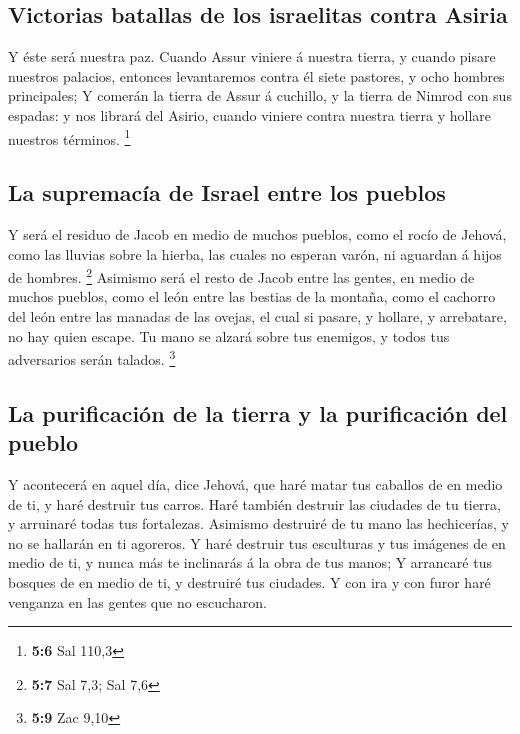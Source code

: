 \hypertarget{victorias-batallas-de-los-israelitas-contra-asiria}{%
\subsection{Victorias batallas de los israelitas contra
Asiria}\label{victorias-batallas-de-los-israelitas-contra-asiria}}

 Y éste será nuestra paz. Cuando Assur viniere á nuestra
tierra, y cuando pisare nuestros palacios, entonces levantaremos contra
él siete pastores, y ocho hombres principales;  Y comerán la
tierra de Assur á cuchillo, y la tierra de Nimrod con sus espadas: y nos
librará del Asirio, cuando viniere contra nuestra tierra y hollare
nuestros términos. \footnote{\textbf{5:6} Sal 110,3}

\hypertarget{la-supremacuxeda-de-israel-entre-los-pueblos}{%
\subsection{La supremacía de Israel entre los
pueblos}\label{la-supremacuxeda-de-israel-entre-los-pueblos}}

 Y será el residuo de Jacob en medio de muchos pueblos, como
el rocío de Jehová, como las lluvias sobre la hierba, las cuales no
esperan varón, ni aguardan á hijos de hombres. \footnote{\textbf{5:7}
  Sal 7,3; Sal 7,6}  Asimismo será el resto de Jacob entre
las gentes, en medio de muchos pueblos, como el león entre las bestias
de la montaña, como el cachorro del león entre las manadas de las
ovejas, el cual si pasare, y hollare, y arrebatare, no hay quien escape.
 Tu mano se alzará sobre tus enemigos, y todos tus
adversarios serán talados. \footnote{\textbf{5:9} Zac 9,10}

\hypertarget{la-purificaciuxf3n-de-la-tierra-y-la-purificaciuxf3n-del-pueblo}{%
\subsection{La purificación de la tierra y la purificación del
pueblo}\label{la-purificaciuxf3n-de-la-tierra-y-la-purificaciuxf3n-del-pueblo}}

 Y acontecerá en aquel día, dice Jehová, que haré matar tus
caballos de en medio de ti, y haré destruir tus carros. 
Haré también destruir las ciudades de tu tierra, y arruinaré todas tus
fortalezas.  Asimismo destruiré de tu mano las hechicerías,
y no se hallarán en ti agoreros.  Y haré destruir tus
esculturas y tus imágenes de en medio de ti, y nunca más te inclinarás á
la obra de tus manos;  Y arrancaré tus bosques de en medio
de ti, y destruiré tus ciudades.  Y con ira y con furor
haré venganza en las gentes que no escucharon.

